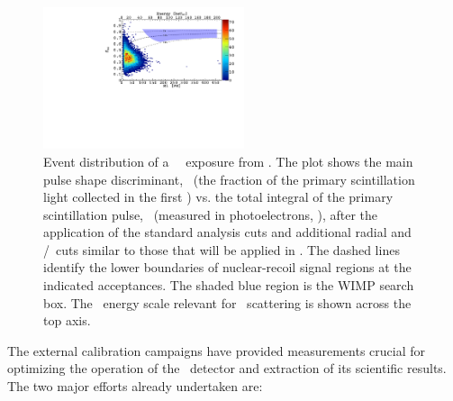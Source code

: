 \begin{figure}[t]
\begin{center}
\includegraphics[width=0.525\textwidth]{./Figures/DSfHighMassSearchExtendedCut.pdf}
\end{center}
\caption{Event distribution of a \DSfDdLTPostQualCut\ \UAr\ exposure from \DSf.  The plot shows the main pulse shape discriminant, \FNine\ (the fraction of the primary scintillation light collected in the first \WindowFNine) vs. the total integral of the primary scintillation pulse, \SOne\ (measured in photoelectrons, \si{\pe}), after the application of the standard analysis cuts and additional radial and \STwo/\SOne\ cuts similar to those that will be applied in \DSks. The dashed lines identify the lower boundaries of nuclear-recoil signal regions at the indicated acceptances.   The shaded blue region is the WIMP search box.  The \NR\ energy scale relevant for \WIMP\ scattering is shown across the top axis.}
\label{fig:DSf-UArExtendedCutResults}	
\end{figure}

The external calibration campaigns have provided measurements crucial for optimizing the operation of the \DSfs\ detector and extraction of its scientific results.  The two major efforts already undertaken are:

